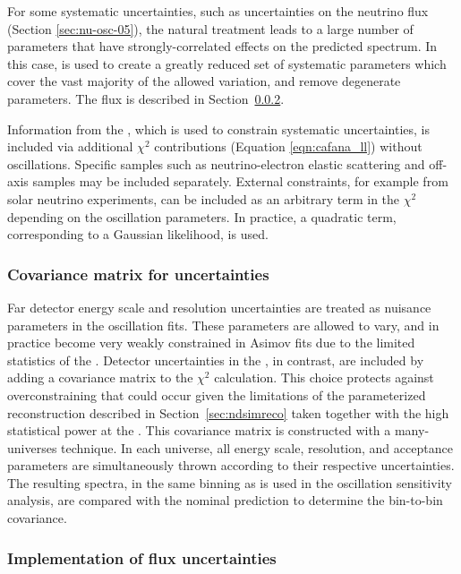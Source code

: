 For some systematic uncertainties, such as uncertainties on the neutrino flux (Section \ref{sec:nu-osc-05}), the natural treatment leads to a large number of parameters that have strongly-correlated effects on the predicted spectrum. In this case,  is used to create a greatly reduced set of systematic parameters which cover the vast majority of the allowed variation, and remove degenerate parameters. The flux   is described in Section~\ref{sec:fluxPCA}.

Information from the , which is used to constrain systematic uncertainties, is included via additional $\chi^2$ contributions (Equation \ref{eqn:cafana_ll}) without oscillations. Specific  samples such as neutrino-electron elastic scattering and off-axis samples may be included separately. %
External constraints, for example from solar neutrino experiments, can be included as an arbitrary term in the $\chi^2$ depending on the oscillation parameters. In practice, a quadratic term, corresponding to a Gaussian likelihood, is used.

\subsubsection{Covariance matrix for  uncertainties}

Far detector energy scale and resolution uncertainties are treated as nuisance parameters in the oscillation fits. These parameters are allowed to vary, and in practice become very weakly constrained in Asimov fits due to the limited statistics of the . Detector uncertainties in the , in contrast, are included by adding a covariance matrix to the $\chi^{2}$ calculation.  This choice protects against overconstraining that could occur given the limitations of the parameterized  reconstruction described in Section~\ref{sec:ndsimreco} taken together with the high statistical power at the .  This covariance matrix is constructed with a many-universes technique. In each universe, all  energy scale, resolution, and acceptance parameters are simultaneously thrown according to their respective uncertainties. The resulting spectra, in the same binning as is used in the oscillation sensitivity analysis, are compared with the nominal prediction to determine the bin-to-bin covariance.



\subsubsection{Implementation of flux uncertainties}
\label{sec:fluxPCA}

